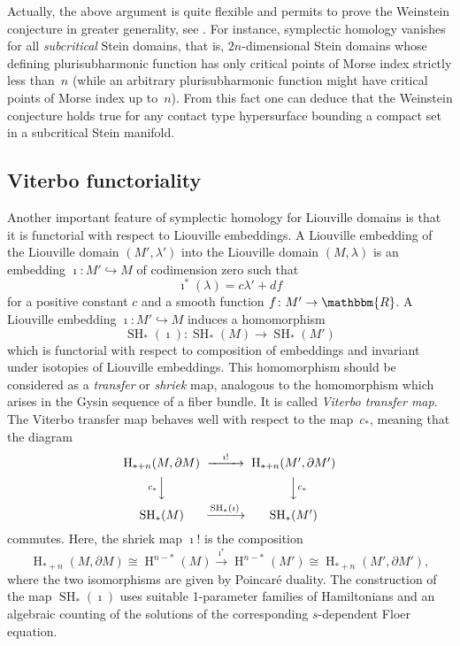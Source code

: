 \documentclass[12pt,twoside]{amsart}
\theoremstyle{plain}
\numberwithin{figure}{section}
\numberwithin{equation}{section}
\def\H{\operatorname{H}}
\def\SH{\operatorname{SH}}
\def\RR{\mathbbm{R}}
\begin{document}
Actually, the above argument is quite flexible and permits to prove the Weinstein conjecture in greater generality, see \cite[Theorem 4.1]{vit99}. For instance, symplectic homology vanishes 
for all {\em subcritical}\/ Stein domains, that is, $2n$-dimensional Stein domains whose defining plurisubharmonic function has only critical points of Morse index strictly less than~$n$ 
(while an arbitrary plurisubharmonic function might have critical points of Morse index 
up to~$n$). From this fact one can deduce that the Weinstein conjecture holds true for any contact type hypersurface bounding a compact set in a subcritical Stein manifold. 

\subsection{Viterbo functoriality} 
Another important feature of symplectic homology for Liouville domains is that it is functorial with respect to Liouville embeddings. A Liouville embedding of the Liouville domain 
$(M',\lambda')$ into the Liouville domain $(M,\lambda)$ is 
an embedding $\imath \colon M' \hookrightarrow M$ of codimension zero such that
\[
\imath^*(\lambda) = c \lambda' + df
\]
for a positive constant $c$ and a smooth function $f \colon M' \rightarrow \RR$. 
A Liouville embedding $\imath \colon M' \hookrightarrow M$ induces a homomorphism
\[
\SH_*(\imath) \colon \SH_*(M) \rightarrow \SH_*(M')
\]
which is functorial with respect to composition of embeddings and 
invariant under isotopies of Liouville embeddings.
This homomorphism should be considered as a {\em transfer}\/ or {\em shriek}\/ map, 
analogous to the homomorphism which arises in the Gysin sequence of a fiber bundle. 
It is called {\em Viterbo transfer map}. The Viterbo transfer map behaves well with respect to the map~$c_*$, meaning that the diagram
\[
\begin{CD}
\H_{*+n}(M,\partial M) @>{\imath !}>> \H_{*+n}(M',\partial M') \\ @V{c_*}VV @VV{c_*}V \\ 
\SH_*(M) @>{\SH_*(\imath)\,}>> \SH_*(M') 
\end{CD}
\]
commutes. Here, the shriek map $\imath !$ is the composition
\[
\H_{*+n}(M,\partial M) \cong \H^{n-*}(M) \stackrel{\imath^*}{\longrightarrow} \H^{n-*}(M') \cong \H_{*+n}(M',\partial M'),
\]
where the two isomorphisms are given by Poincar\'e duality. The construction of the map 
$\SH_*(\imath)$ uses suitable 1-parameter families of Hamiltonians and an algebraic counting 
of the solutions of the corresponding $s$-dependent Floer equation.
 
\end{document}
